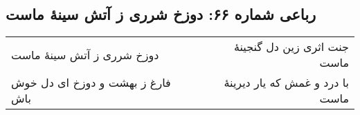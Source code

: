 \begin{center}
\section*{رباعی شماره ۶۶: دوزخ شرری ز آتش سینهٔ ماست}
\label{sec:sh066}
\begin{longtable}{l p{0.5cm} r}
دوزخ شرری ز آتش سینهٔ ماست
&&
جنت اثری زین دل گنجینهٔ ماست
\\
فارغ ز بهشت و دوزخ ای دل خوش باش
&&
با درد و غمش که یار دیرینهٔ ماست
\\
\end{longtable}
\end{center}
